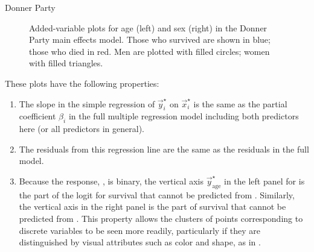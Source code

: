 \documentclass[11pt]{book}
\renewenvironment{knitrout}{\small\renewcommand{\baselinestretch}{.85}}{} %
\begin{document}
\begin{Example}[donner4]{Donner Party}
\begin{knitrout}
\begin{figure}[!htbp]
\caption[Added-variable plots for age (left) and sex (right) in the Donner Party main effects model]{Added-variable plots for age (left) and sex (right) in the Donner Party main effects model. Those who survived are shown in blue; those who died in red. Men are plotted with filled circles; women with filled triangles. \label{fig:donner4-avp}}
\end{figure}


\end{knitrout}

These plots have the following properties:
\begin{enumerate}

\item The slope in the simple regression of $\vec{y}_i^\star$ on $\vec{x}_i^\star$
is the same as the partial coefficient $\beta_i$ in the full multiple regression model including
both predictors here (or all predictors in general).

\item The residuals from this regression line are the same as the residuals in the full model.

\item Because the response, , is binary, the vertical axis
$\vec{y}_{\mathrm{age}}^\star$ in the left panel for  is the part of the logit for
survival that cannot be predicted from .  Similarly, the vertical axis in the
right panel is the part of survival that cannot be predicted from .
This property allows the clusters of points corresponding to discrete variables to be
seen more readily, particularly if they are distinguished by visual attributes such
as color and shape, as in .

\end{enumerate}


\end{Example}
\end{document}
